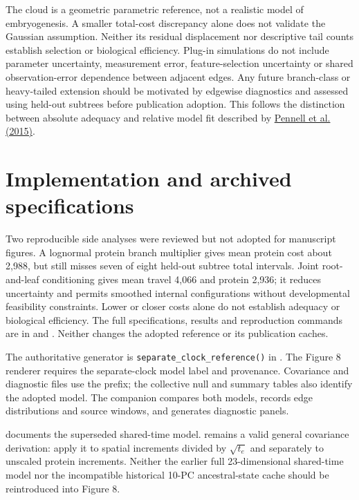 \documentclass[10pt,letterpaper]{article}
\begin{document}
The cloud is a geometric parametric reference, not a realistic model of
embryogenesis. A smaller total-cost discrepancy alone does not validate the
Gaussian assumption. Neither its residual displacement nor descriptive tail
counts establish selection or biological efficiency. Plug-in simulations do
not include parameter uncertainty, measurement error, feature-selection
uncertainty or shared observation-error dependence between adjacent edges.
Any future branch-class or heavy-tailed extension should be motivated by
edgewise diagnostics and assessed using held-out subtrees before publication
adoption. This follows the distinction between absolute adequacy and relative
model fit described by \href{https://doi.org/10.1086/682022}{Pennell et al. (2015)}.

\section{Implementation and archived specifications}

Two reproducible side analyses were reviewed but not adopted for manuscript
figures. A lognormal protein branch multiplier gives mean protein cost about
2,988, but still misses seven of eight held-out subtree total intervals.
Joint root-and-leaf conditioning gives mean travel 4,066 and protein 2,936;
it reduces uncertainty and permits smoothed internal configurations without
developmental feasibility constraints. Lower or closer costs alone do not
establish adequacy or biological efficiency. The full specifications, results
and reproduction commands are in
 and
.
Neither changes the adopted reference or its publication caches.

The authoritative generator is \texttt{separate\_clock\_reference()} in
. The Figure 8 renderer
requires the separate-clock model label and provenance. Covariance and
diagnostic files use the  prefix;
the collective null and summary tables also identify the adopted model.
The companion  compares both models, records
edge distributions and source windows, and generates diagnostic panels.

 documents the superseded
shared-time model. 
remains a valid general covariance derivation: apply it to spatial increments
divided by $\sqrt{t_e}$ and separately to unscaled protein increments.
Neither the earlier full 23-dimensional shared-time model nor the incompatible
historical 10-PC ancestral-state cache should be reintroduced into Figure 8.
\end{document}
